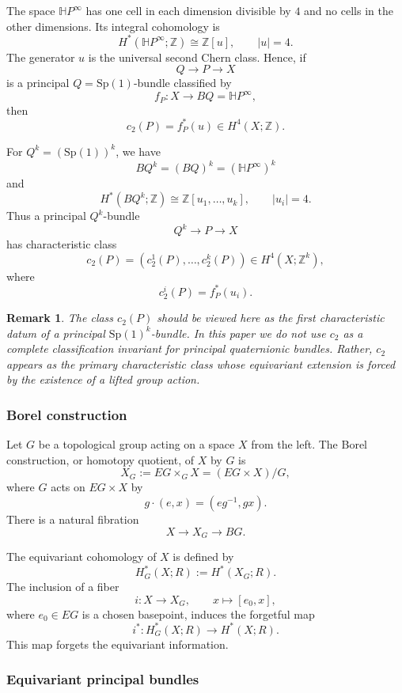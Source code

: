 \documentclass[11pt,a4paper]{article}
\numberwithin{equation}{section}
\newtheorem{remark}[definition]{Remark}
\theoremstyle{named}
\begin{document}
The space \(\mathbb HP^\infty\) has one cell in each dimension divisible by \(4\) and no cells in the other dimensions. Its integral cohomology is
\[
H^*(\mathbb HP^\infty;\mathbb Z)\cong \mathbb Z[u],
\qquad
|u|=4.
\]
The generator \(u\) is the universal second Chern class. Hence, if
\[
Q\longrightarrow P\longrightarrow X
\]
is a principal \(Q=\text{Sp}(1)\)-bundle classified by
\[
f_P:X\longrightarrow BQ=\mathbb HP^\infty,
\]
then
\[
c_2(P)=f_P^*(u)\in H^4(X;\mathbb Z).
\]

For \(Q^k=(\text{Sp}(1))^k\), we have
\[
BQ^k=(BQ)^k=(\mathbb HP^\infty)^k
\]
and
\[
H^*(BQ^k;\mathbb Z)
\cong
\mathbb Z[u_1,\ldots,u_k],
\qquad
|u_i|=4.
\]
Thus a principal \(Q^k\)-bundle
\[
Q^k\longrightarrow P\longrightarrow X
\]
has characteristic class
\[
c_2(P)=(c_2^1(P),\ldots,c_2^k(P))
\in H^4(X;\mathbb Z^k),
\]
where
\[
c_2^i(P)=f_P^*(u_i).
\]

\begin{remark}
The class \(c_2(P)\) should be viewed here as the first characteristic datum of a principal \(\text{Sp}(1)^k\)-bundle. In this paper we do not use \(c_2\) as a complete classification invariant for principal quaternionic bundles. Rather, \(c_2\) appears as the primary characteristic class whose equivariant extension is forced by the existence of a lifted group action.
\end{remark}

\subsubsection{Borel construction}

Let \(G\) be a topological group acting on a space \(X\) from the left. The Borel construction, or homotopy quotient, of \(X\) by \(G\) is
\[
X_G:=EG\times_G X=(EG\times X)/G,
\]
where \(G\) acts on \(EG\times X\) by
\[
g\cdot(e,x)=(eg^{-1},gx).
\]
There is a natural fibration
\[
X\longrightarrow X_G\longrightarrow BG.
\]

The equivariant cohomology of \(X\) is defined by
\[
H_G^*(X;R):=H^*(X_G;R).
\]
The inclusion of a fiber
\[
i:X\longrightarrow X_G,
\qquad
x\mapsto[e_0,x],
\]
where \(e_0\in EG\) is a chosen basepoint, induces the forgetful map
\[
i^*:H_G^*(X;R)\longrightarrow H^*(X;R).
\]
This map forgets the equivariant information.

\subsubsection{Equivariant principal bundles}
\end{document}
